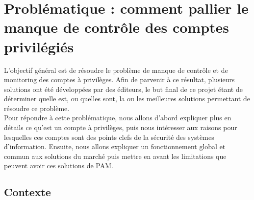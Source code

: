 %
%
%
%
%
%

\section{Problématique : comment pallier le manque de contrôle des comptes privilégiés}

L'objectif général est de résoudre le problème de manque de contrôle et de monitoring des comptes à privilèges. Afin de parvenir à ce résultat, plusieurs solutions ont été développées par des éditeurs, le but final de ce projet étant de déterminer quelle est, ou quelles sont, la ou les meilleures solutions permettant de résoudre ce problème.\\
Pour répondre à cette problématique, nous allons d'abord expliquer plus en détails ce qu'est un compte à privilèges, puis nous intéresser aux raisons pour lesquelles ces comptes sont des points clefs de la sécurité des systèmes d'information. Ensuite, nous allons expliquer un fonctionnement global et commun aux solutions du marché puis mettre en avant les limitations que peuvent avoir ces solutions de PAM.

\subsection{Contexte}

